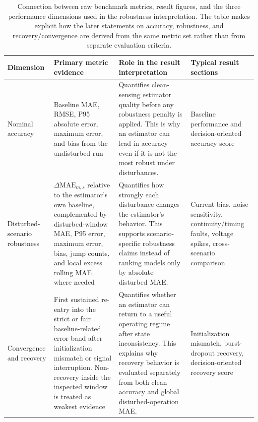 \documentclass[
    a4paper,
    12pt,
    titlepage,
    bibliography=totoc,
    twoside=on,
    parskip=false,
    numbers=noenddot,
    cleardoublepage=empty,
    DIV=12,
    BCOR=12.0mm,
    headheight=36pt,
    headings=openright
]{scrreprt}
\begin{document}
\begin{table}[H]
    \centering
    \small
    \caption[Connection between raw metrics and result dimensions.]{Connection between raw benchmark metrics, result figures, and the three performance dimensions used in the robustness interpretation. The table makes explicit how the later statements on accuracy, robustness, and recovery/convergence are derived from the same metric set rather than from separate evaluation criteria.}
    \label{tab:robustness_metric_dimensions}
    \begin{tabularx}{\textwidth}{>{\raggedright\arraybackslash}p{2.5cm}>{\raggedright\arraybackslash}X>{\raggedright\arraybackslash}X>{\raggedright\arraybackslash}p{3.0cm}}
        \toprule
        Dimension & Primary metric evidence & Role in the result interpretation & Typical result sections \\
        \midrule
        Nominal accuracy & Baseline MAE, RMSE, P95 absolute error, maximum error, and bias from the undisturbed run & Quantifies clean-sensing estimator quality before any robustness penalty is applied. This is why an estimator can lead in accuracy even if it is not the most robust under disturbances. & Baseline performance and decision-oriented accuracy score \\
        Disturbed-scenario robustness & $\Delta\mathrm{MAE}_{m,s}$ relative to the estimator's own baseline, complemented by disturbed-window MAE, P95 error, maximum error, bias, jump counts, and local excess rolling MAE where needed & Quantifies how strongly each disturbance changes the estimator's behavior. This supports scenario-specific robustness claims instead of ranking models only by absolute disturbed MAE. & Current bias, noise sensitivity, continuity/timing faults, voltage spikes, cross-scenario comparison \\
        Convergence and recovery & First sustained re-entry into the strict or fair baseline-related error band after initialization mismatch or signal interruption. Non-recovery inside the inspected window is treated as weakest evidence & Quantifies whether an estimator can return to a useful operating regime after state inconsistency. This explains why recovery behavior is evaluated separately from both clean accuracy and global disturbed-operation MAE. & Initialization mismatch, burst-dropout recovery, decision-oriented recovery score \\
        \bottomrule
    \end{tabularx}
\end{table}
\end{document}
